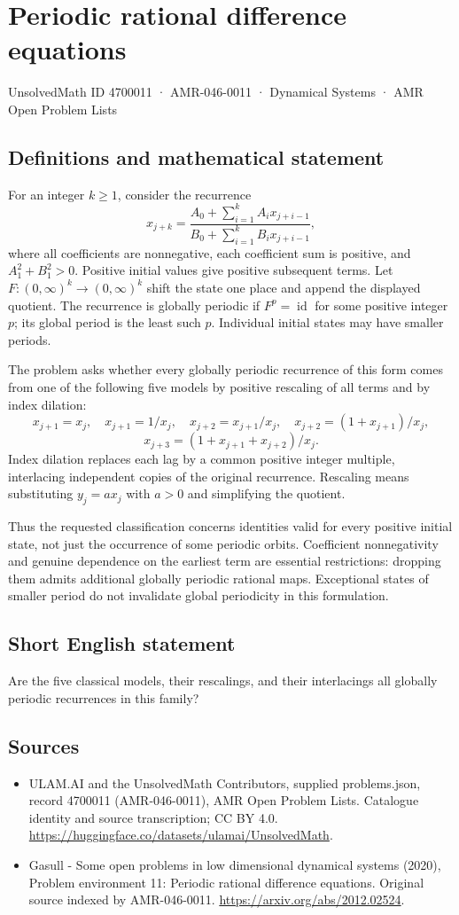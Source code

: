 \documentclass[11pt,a4paper]{article}
\begin{document}
\section*{Periodic rational difference equations}\label{4700011}
{\small UnsolvedMath ID 4700011 · AMR-046-0011 · Dynamical Systems · AMR Open Problem Lists}
\subsection{Definitions and mathematical statement}
For an integer $k\ge1$, consider the recurrence
\[
 x_{j+k}=\frac{A_0+\sum_{i=1}^k A_i x_{j+i-1}}
                  {B_0+\sum_{i=1}^k B_i x_{j+i-1}},
\]
where all coefficients are nonnegative, each coefficient sum is positive,
and $A_1^2+B_1^2>0$. Positive initial values give positive subsequent terms.
Let $F:(0,\infty)^k\to(0,\infty)^k$ shift the state one place and append
the displayed quotient. The recurrence is globally periodic if
$F^p=\operatorname{id}$ for some positive integer $p$; its global period is
the least such $p$. Individual initial states may have smaller periods.

The problem asks whether every globally periodic recurrence of this form
comes from one of the following five models by positive rescaling of all
terms and by index dilation:
\[
 x_{j+1}=x_j,\quad x_{j+1}=1/x_j,\quad
 x_{j+2}=x_{j+1}/x_j,\quad x_{j+2}=(1+x_{j+1})/x_j,
\]
\[
 x_{j+3}=(1+x_{j+1}+x_{j+2})/x_j.
\]
Index dilation replaces each lag by a common positive integer multiple,
interlacing independent copies of the original recurrence. Rescaling means
substituting $y_j=a x_j$ with $a>0$ and simplifying the quotient.

Thus the requested classification concerns identities valid for every
positive initial state, not just the occurrence of some periodic orbits.
Coefficient nonnegativity and genuine dependence on the earliest term are
essential restrictions: dropping them admits additional globally periodic
rational maps. Exceptional states of smaller period do not invalidate
global periodicity in this formulation.
\subsection{Short English statement}
Are the five classical models, their rescalings, and their interlacings all globally periodic recurrences in this family?
\subsection{Sources}
\begin{itemize}
\item[S1] ULAM.AI and the UnsolvedMath Contributors, supplied problems.json, record 4700011 (AMR-046-0011), AMR Open Problem Lists. Catalogue identity and source transcription; CC BY 4.0.
\url{https://huggingface.co/datasets/ulamai/UnsolvedMath}.
\item[S2] Gasull - Some open problems in low dimensional dynamical systems (2020), Problem environment 11: Periodic rational difference equations. Original source indexed by AMR-046-0011.
\url{https://arxiv.org/abs/2012.02524}.
\end{itemize}
\end{document}
